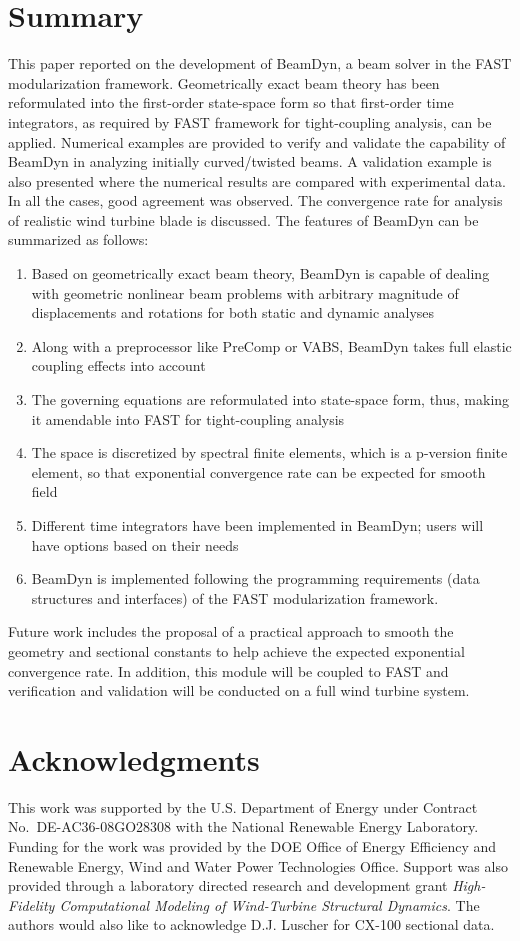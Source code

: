 \documentclass{aiaa-tc}
\begin{document}
 \section{Summary}
  This paper reported on the development of BeamDyn, a beam solver in the FAST modularization framework. Geometrically exact beam theory has been reformulated into the first-order state-space form so that first-order time integrators, as required by FAST framework for tight-coupling analysis, can be applied. Numerical examples are provided to verify and validate the capability of BeamDyn in analyzing initially curved/twisted beams. A validation example is also presented where the numerical results are compared with experimental data. In all the cases, good agreement was observed.  The convergence rate for analysis of realistic wind turbine blade is discussed. The features of BeamDyn can be summarized as follows:
  \begin{enumerate}
  \item Based on geometrically exact beam theory, BeamDyn is capable of dealing with geometric nonlinear beam problems with arbitrary magnitude of displacements and rotations for both static and dynamic analyses
  \item Along with a preprocessor like PreComp or VABS, BeamDyn takes full elastic coupling effects into account
  \item The governing equations are reformulated into state-space form, thus, making it amendable into FAST for tight-coupling analysis
  \item The space is discretized by spectral finite elements, which is a p-version finite element, so that exponential convergence rate can be expected for smooth field
  \item Different time integrators have been implemented in BeamDyn; users will have options based on their needs
  \item BeamDyn is implemented following the programming requirements (data structures and interfaces) of the FAST modularization framework.
  \end{enumerate}
   Future work includes the proposal of a practical approach to smooth the geometry and sectional constants to help achieve the expected exponential convergence rate. In addition, this module will be coupled to FAST and verification and validation will be conducted on a full wind turbine system. 
  
\section*{Acknowledgments} 

This work was supported by the U.S. Department of Energy under Contract No.\
DE-AC36-08GO28308 with the National Renewable Energy Laboratory. Funding for the work was provided by the DOE Office of Energy Efficiency and Renewable Energy, Wind and Water Power Technologies Office. Support
was also provided through a laboratory directed research and development grant
\textit{High-Fidelity Computational Modeling of Wind-Turbine Structural
Dynamics}. The authors would also like to acknowledge D.J. Luscher for CX-100 sectional data.
  
  



\end{document}
